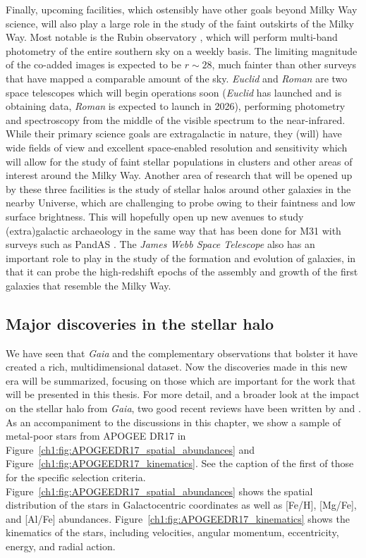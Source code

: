 Finally, upcoming facilities, which ostensibly have other goals beyond Milky Way science, will also play a large role in the study of the faint outskirts of the Milky Way. Most notable is the Rubin observatory \parencite{lsst}, which will perform multi-band photometry of the entire southern sky on a weekly basis. The limiting magnitude of the co-added images is expected to be $r \sim 28$, much fainter than other surveys that have mapped a comparable amount of the sky. \textit{Euclid} and \textit{Roman} are two space telescopes which will begin operations soon (\textit{Euclid} has launched and is obtaining data, \textit{Roman} is expected to launch in 2026), performing photometry and spectroscopy from the middle of the visible spectrum to the near-infrared. While their primary science goals are extragalactic in nature, they (will) have wide fields of view and excellent space-enabled resolution and sensitivity which will allow for the study of faint stellar populations in clusters and other areas of interest around the Milky Way. Another area of research that will be opened up by these three facilities is the study of stellar halos around other galaxies in the nearby Universe, which are challenging to probe owing to their faintness and low surface brightness. This will hopefully open up new avenues to study (extra)galactic archaeology in the same way that has been done for M31 with surveys such as PandAS \parencite{mcconnachie09}. The \textit{James Webb Space Telescope} also has an important role to play in the study of the formation and evolution of galaxies, in that it can probe the high-redshift epochs of the assembly and growth of the first galaxies that resemble the Milky Way.

\subsection{Major discoveries in the stellar halo}

We have seen that \textit{Gaia} and the complementary observations that bolster it have created a rich, multidimensional dataset. Now the discoveries made in this new era will be summarized, focusing on those which are important for the work that will be presented in this thesis. For more detail, and a broader look at the impact on the stellar halo from \textit{Gaia}, two good recent reviews have been written by \textcite{helmi20} and \textcite{deason24}. As an accompaniment to the discussions in this chapter, we show a sample of metal-poor stars from APOGEE DR17 in Figure~\ref{ch1:fig:APOGEEDR17_spatial_abundances} and Figure~\ref{ch1:fig:APOGEEDR17_kinematics}. See the caption of the first of those for the specific selection criteria. Figure~\ref{ch1:fig:APOGEEDR17_spatial_abundances} shows the spatial distribution of the stars in Galactocentric coordinates as well as [Fe/H], [Mg/Fe], and [Al/Fe] abundances. Figure~\ref{ch1:fig:APOGEEDR17_kinematics} shows the kinematics of the stars, including velocities, angular momentum, eccentricity, energy, and radial action.

